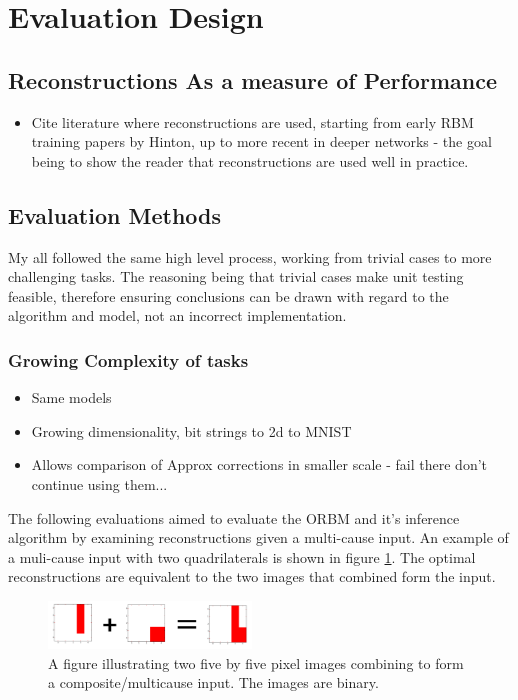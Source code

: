 \section{Evaluation Design}


\subsection{Reconstructions As a measure of Performance}

\begin{itemize}
  \item Cite literature where reconstructions are used, starting from early RBM training papers by Hinton, up to more recent in deeper networks - the goal being to show the reader that reconstructions are used well in practice.
\end{itemize}


\subsection{Evaluation Methods}

My  all followed the same high level process, working from trivial cases to more challenging tasks. The reasoning being that trivial cases make unit testing feasible, therefore ensuring conclusions can be drawn with regard to the algorithm and model, not an incorrect implementation.

\subsubsection{Growing Complexity of tasks}

\begin{itemize}
  \item Same models
  \item Growing dimensionality, bit strings to 2d to MNIST
  \item Allows comparison of Approx corrections in smaller scale - fail there don't continue using them...
\end{itemize}

The following evaluations aimed to evaluate the ORBM and it's inference algorithm by examining reconstructions given a multi-cause input. An example of a muli-cause input with two quadrilaterals is shown in figure \ref{F:Composite-Example}. The optimal reconstructions are equivalent to the two images that combined form the input.

\begin{figure}
  \begin{center}
    \includegraphics[width=0.48\textwidth]{Assets/Composite-Example.png}
  \end{center}
  \caption{A figure illustrating two five by five pixel images combining to form a composite/multicause input. The images are binary.}
  \label{F:Composite-Example}
\end{figure}

